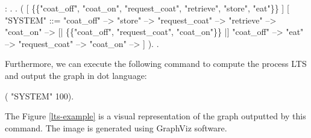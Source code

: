 \begin{coqdoccode}
	\coqdocnoindent
	  : .\coqdoceol
	\coqdocnoindent
	.\coqdoceol
	\coqdocindent{1.00em}
	 (\coqdoceol
	\coqdocindent{2.00em}
	\coqdoceol
	\coqdocindent{2.00em}
	[  \{\{"coat\_off", "coat\_on", "request\_coat", "retrieve", "store", "eat"\}\} ]\coqdoceol
	\coqdocindent{2.00em}
	[ "SYSTEM" ::=\coqdoceol
	\coqdocindent{3.00em}
	"coat\_off" --> "store" --> "request\_coat" --> "retrieve" --> "coat\_on" --> \coqdoceol
	\coqdocindent{3.00em}
	[| \{\{"coat\_off", "request\_coat", "coat\_on"\}\} |]\coqdoceol
	\coqdocindent{3.00em}
	"coat\_off" --> "eat" --> "request\_coat" --> "coat\_on" -->  ]\coqdoceol
	\coqdocindent{1.00em}
	).\coqdoceol
	\coqdocnoindent
	.\coqdoceol
\end{coqdoccode}

Furthermore, we can execute the following command to compute the process LTS and output the graph in dot language:

\begin{coqdoccode}
	\coqdocnoindent
	  (  "SYSTEM" 100).\coqdoceol
\end{coqdoccode}

The Figure \ref{lts-example} is a visual representation of the graph outputted by this command. The image is generated using GraphViz software.

